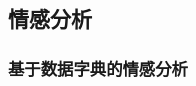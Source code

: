 \documentclass[cs4size,a4paper]{ctexart}
\numberwithin{equation}{section}
\numberwithin{table}{section}
\numberwithin{figure}{section}
\begin{document}



\subsection{情感分析}


\subsubsection{基于数据字典的情感分析}

\end{document}
